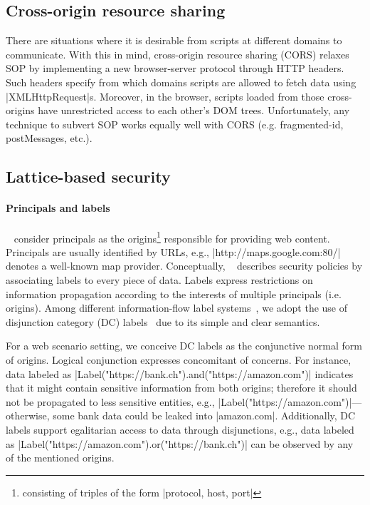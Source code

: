 \subsection{Cross-origin resource sharing } 
\label{sec:background:cors}


There are situations where it is desirable from scripts at different domains to
communicate. With this in mind, cross-origin resource sharing (CORS) relaxes SOP
by implementing a new browser-server protocol through HTTP headers.  Such
headers specify from which domains scripts are allowed to fetch data 
using \js|XMLHttpRequest|s. Moreover, in the browser, scripts loaded from
those cross-origins have unrestricted access to each other's DOM
trees. Unfortunately, any technique to subvert SOP works equally well with CORS 
(e.g. fragmented-id, postMessages, etc.).


\subsection{Lattice-based security}

\paragraph{Principals and labels}

\sys~ consider principals as the origins\footnote{consisting of triples of the
  form \js|{protocol, host, port}|} responsible for providing web
content. Principals are usually identified by URLs, e.g., 
\js|http://maps.google.com:80/| denotes a well-known map provider.
Conceptually, \sys~ describes security policies by associating labels to every
piece of data. Labels express restrictions on information propagation according
to the interests of multiple principals (i.e. origins). Among different
information-flow label systems~\cite{GenLabels}, we adopt the use of disjunction
category (DC) labels~\cite{stefan:2011:dclabels} due to its simple and clear
semantics.

For a web scenario setting, we conceive DC labels as the conjunctive normal form
of origins. Logical conjunction expresses concomitant of concerns. For instance,
data labeled as \js|Label("https://bank.ch").and("https://amazon.com")|
indicates that it might contain sensitive information from both origins;
therefore it should not be propagated to less sensitive entities, e.g.,
\js|Label("https://amazon.com")|---otherwise, some bank data could be leaked
into \js|amazon.com|. Additionally, DC labels support egalitarian access to data
through disjunctions, e.g., data labeled as 
\js|Label("https://amazon.com").or("https://bank.ch")| can be
observed by any of the mentioned origins. 


